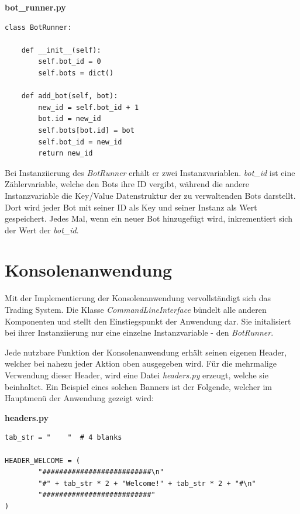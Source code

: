 \documentclass[oneside]{ausarbeitung}
\begin{document}
\lstset{language=Python}
\lstset{frame=lines}
\lstset{basicstyle=\footnotesize}
\textbf{bot\_runner.py}
\begin{lstlisting}
class BotRunner:

	def __init__(self):
		self.bot_id = 0
		self.bots = dict()

	def add_bot(self, bot):
		new_id = self.bot_id + 1
		bot.id = new_id
		self.bots[bot.id] = bot
		self.bot_id = new_id
		return new_id
\end{lstlisting}

Bei Instanziierung des \textit{BotRunner} erhält er zwei Instanzvariablen. \textit{bot\_id} ist eine Zählervariable, welche den Bots ihre ID vergibt, während die andere Instanzvariable die Key/Value Datenstruktur der zu verwaltenden Bots darstellt. Dort wird jeder Bot mit seiner ID als Key und seiner Instanz als Wert gespeichert. Jedes Mal, wenn ein neuer Bot hinzugefügt wird, inkrementiert sich der Wert der \textit{bot\_id}.


\section{Konsolenanwendung}
\label{sec:konsolenanwendung}

Mit der Implementierung der Konsolenanwendung vervollständigt sich das Trading System. Die Klasse \textit{CommandLineInterface} bündelt alle anderen Komponenten und stellt den Einstiegspunkt der Anwendung dar. Sie initalisiert bei ihrer Instanziierung nur eine einzelne Instanzvariable - den \textit{BotRunner}.

Jede nutzbare Funktion der Konsolenanwendung erhält seinen eigenen Header, welcher bei nahezu jeder Aktion oben ausgegeben wird. Für die mehrmalige Verwendung dieser Header, wird eine Datei \textit{headers.py} erzeugt, welche sie beinhaltet. Ein Beispiel eines solchen Banners ist der Folgende, welcher im Hauptmenü der Anwendung gezeigt wird:

\newpage
\lstset{language=Python}
\lstset{frame=lines}
\lstset{basicstyle=\footnotesize}
\textbf{headers.py}
\begin{lstlisting}
tab_str = "    "  # 4 blanks

HEADER_WELCOME = (
        "##########################\n"
        "#" + tab_str * 2 + "Welcome!" + tab_str * 2 + "#\n"
        "##########################"
)
\end{lstlisting}
\end{document}
